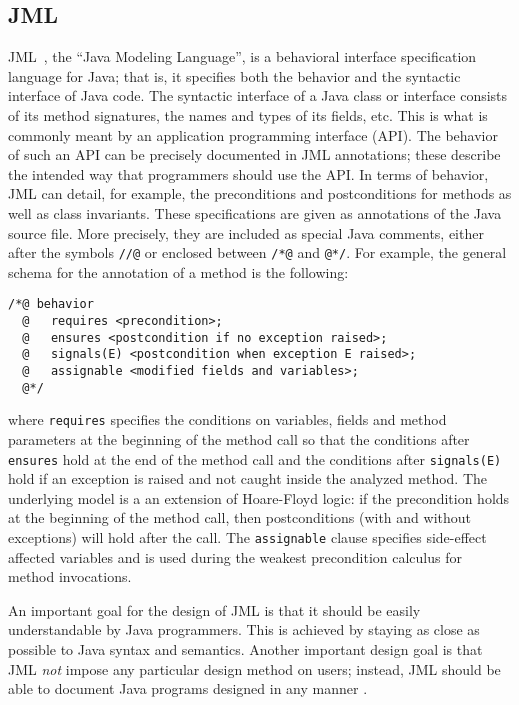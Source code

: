 \subsection{JML}
JML~\cite{Leavens-Baker-Ruby99b,Leavens-Baker-Ruby03}, the ``Java
Modeling Language'', is a behavioral interface specification language
for Java; that is, it specifies both the behavior and the syntactic
interface of Java code.  The syntactic interface of a Java class or
interface consists of its method signatures, the names and types of
its fields, etc.  This is what is commonly meant by an application
programming interface (API).  The behavior of such an API can be
precisely documented in JML annotations; these describe the intended
way that programmers should use the API.  In terms of behavior, JML
can detail, for example, the preconditions and postconditions for
methods as well as class invariants. These specifications are given as
annotations of the Java source file. More precisely, they are included
as special Java comments, either after the symbols \lstinline!//@! or
enclosed between \lstinline!/*@! and
\lstinline[basicstyle=\normalfont\ttfamily\small\sl]!@*/!. For example,
the general schema for the annotation of a method is the following:
\begin{lstlisting}
/*@ behavior
  @   requires <precondition>;
  @   ensures <postcondition if no exception raised>;
  @   signals(E) <postcondition when exception E raised>;
  @   assignable <modified fields and variables>;
  @*/
\end{lstlisting}
where \lstinline!requires! specifies the conditions on variables, fields
and method parameters at the beginning of the method call so that the
conditions after \lstinline!ensures! hold at the end of the method
call and the conditions after \lstinline!signals(E)! hold if an
exception is raised and not caught inside the analyzed method.  The
underlying model is a an extension of Hoare-Floyd logic: if the
precondition holds at the beginning of the method call, then
postconditions (with and without exceptions) will hold after the
call. The \lstinline!assignable! clause specifies side-effect affected
variables and is used during the weakest precondition calculus for
method invocations.

An important goal for the design of JML is that it should be easily
understandable by Java programmers. This is achieved by staying as
close as possible to Java syntax and semantics.  Another important
design goal is that JML {\em not} impose any particular design method
on users; instead, JML should be able to document Java programs
designed in any manner \cite{Leavens-Baker-Ruby03}.

